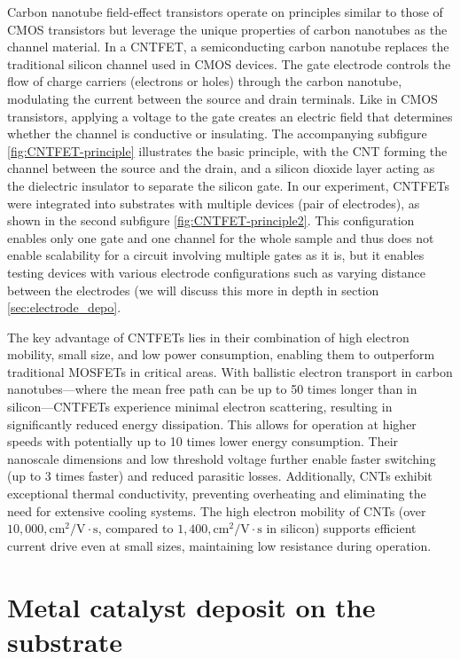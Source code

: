 \documentclass[a4paper,12pt,twoside]{article}
\begin{document}
Carbon nanotube field-effect transistors operate on principles similar to those of CMOS transistors but leverage the unique properties of carbon nanotubes as the channel material. In a CNTFET, a semiconducting carbon nanotube replaces the traditional silicon channel used in CMOS devices. The gate electrode controls the flow of charge carriers (electrons or holes) through the carbon nanotube, modulating the current between the source and drain terminals. Like in CMOS transistors, applying a voltage to the gate creates an electric field that determines whether the channel is conductive or insulating. The accompanying subfigure \ref{fig:CNTFET-principle} illustrates the basic principle, with the CNT forming the channel between the source and the drain, and a silicon dioxide layer acting as the dielectric insulator to separate the silicon gate. In our experiment, CNTFETs were integrated into substrates with multiple devices (pair of electrodes), as shown in the second subfigure \ref{fig:CNTFET-principle2}. This configuration enables only one gate and one channel for the whole sample and thus does not enable scalability for a circuit involving multiple gates as it is, but it enables testing devices with various electrode configurations such as varying distance between the electrodes (we will discuss this more in depth in section \ref{sec:electrode_depo}.

The key advantage of CNTFETs lies in their combination of high electron mobility, small size, and low power consumption, enabling them to outperform traditional MOSFETs in critical areas. With ballistic electron transport in carbon nanotubes—where the mean free path can be up to 50 times longer than in silicon—CNTFETs experience minimal electron scattering, resulting in significantly reduced energy dissipation. This allows for operation at higher speeds with potentially up to 10 times lower energy consumption. Their nanoscale dimensions and low threshold voltage further enable faster switching (up to 3 times faster) and reduced parasitic losses. Additionally, CNTs exhibit exceptional thermal conductivity, preventing overheating and eliminating the need for extensive cooling systems. The high electron mobility of CNTs (over $10,000 , \mathrm{cm}^2/\mathrm{V \cdot s}$, compared to $1,400 , \mathrm{cm}^2/\mathrm{V \cdot s}$ in silicon) supports efficient current drive even at small sizes, maintaining low resistance during operation.

\newpage
\label{sec:matter_depo}
\section{Metal catalyst deposit on the substrate}
\end{document}

